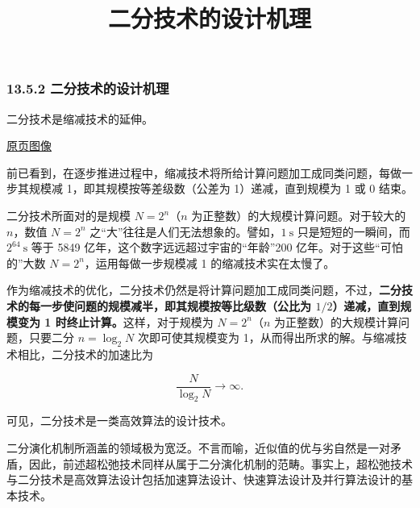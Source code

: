 \documentclass[
  10pt,
  fontset=fandol]{ctexart}
\title{二分技术的设计机理}
\author{}
\date{}
\begin{document}
\maketitle

\subsubsection{13.5.2 二分技术的设计机理}\label{ux4e8cux5206ux6280ux672fux7684ux8bbeux8ba1ux673aux7406}

二分技术是缩减技术的延伸。

\href{../../source-images/pdf-316.jpeg}{原页图像}

前已看到，在逐步推进过程中，缩减技术将所给计算问题加工成同类问题，每做一步其规模减 1，即其规模按等差级数（公差为 1）递减，直到规模为 1 或 0 结束。

二分技术所面对的是规模 \(N=2^n\)（\(n\) 为正整数）的大规模计算问题。对于较大的 \(n\)，数值 \(N=2^n\) 之``大''往往是人们无法想象的。譬如，\(1\ \mathrm{s}\) 只是短短的一瞬间，而 \(2^{64}\ \mathrm{s}\) 等于 5849 亿年，这个数字远远超过宇宙的``年龄''200 亿年。对于这些``可怕的''大数 \(N=2^n\)，运用每做一步规模减 1 的缩减技术实在太慢了。

作为缩减技术的优化，二分技术仍然是将计算问题加工成同类问题，不过，\textbf{二分技术的每一步使问题的规模减半，即其规模按等比级数（公比为 \(1/2\)）递减，直到规模变为 1 时终止计算。}这样，对于规模为 \(N=2^n\)（\(n\) 为正整数）的大规模计算问题，只要二分 \(n=\log_2N\) 次即可使其规模变为 1，从而得出所求的解。与缩减技术相比，二分技术的加速比为

\[
\frac{N}{\log_2N}\longrightarrow\infty.
\]

可见，二分技术是一类高效算法的设计技术。

二分演化机制所涵盖的领域极为宽泛。不言而喻，近似值的优与劣自然是一对矛盾，因此，前述超松弛技术同样从属于二分演化机制的范畴。事实上，超松弛技术与二分技术是高效算法设计包括加速算法设计、快速算法设计及并行算法设计的基本技术。
\end{document}
